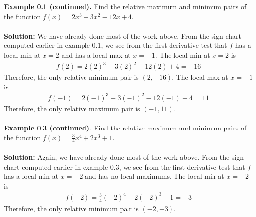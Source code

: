 \documentclass[reqno,psamsfonts]{amsart}
\theoremstyle{definition}
\theoremstyle{remark}
\numberwithin{equation}{section}
\begin{document}
\noindent\textbf{Example 0.1 (continued).}
Find the relative maximum and minimum pairs of the function $f(x) = 2x^3-3x^2-12x+4$.
\\
\\\textbf{Solution:} We have already done most of the work above. From the sign chart computed earlier in example 0.1, we see from the first derivative test that $f$ has a local min at $x=2$ and has a local max at $x=-1$. The local min at $x=2$ is 
\begin{align*}
f(2) = 2(2)^3-3(2)^2-12(2)+4=-16
\end{align*}
Therefore, the only relative minimum pair is $(2,-16)$.  The local max at $x=-1$ is 
\begin{align*}
f(-1) = 2(-1)^3-3(-1)^2-12(-1)+4=11
\end{align*}
Therefore, the only relative maximum pair is $(-1,11)$. 
\\
\\
\noindent\textbf{Example 0.3 (continued).}
Find the relative maximum and minimum pairs of the function $f(x) = \frac{3}{4}x^4+2x^3+1$.
\\
\\\textbf{Solution:} Again, we have already done most of the work above. From the sign chart computed earlier in example 0.3, we see from the first derivative test that $f$ has a local min at $x=-2$ and has no local maximums. The local min at $x=-2$ is 
\begin{align*}
f(-2) = \frac{3}{4}(-2)^4+2(-2)^3+1=-3
\end{align*}
Therefore, the only relative minimum pair is $(-2,-3)$. 

\newpage
\end{document}
